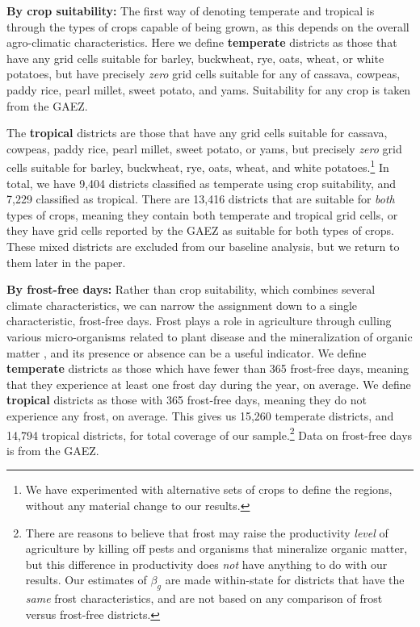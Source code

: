 \documentclass[11pt]{article}
\begin{document}
\vspace{.5cm}\noindent\textbf{By crop suitability:} The first way of denoting temperate and tropical is through the types of crops capable of being grown, as this depends on the overall agro-climatic characteristics. Here we define \textbf{temperate} districts as those that have any grid cells suitable for barley, buckwheat, rye, oats, wheat, or white potatoes, but have precisely \textit{zero} grid cells suitable for any of cassava, cowpeas, paddy rice, pearl millet, sweet potato, and yams. Suitability for any crop is taken from the GAEZ.

The \textbf{tropical} districts are those that have any grid cells suitable for cassava, cowpeas, paddy rice, pearl millet, sweet potato, or yams, but precisely \textit{zero} grid cells suitable for barley, buckwheat, rye, oats, wheat, and white potatoes.\footnote{We have experimented with alternative sets of crops to define the regions, without any material change to our results.} In total, we have 9,404 districts classified as temperate using crop suitability, and 7,229 classified as tropical. There are 13,416 districts that are suitable for \textit{both} types of crops, meaning they contain both temperate and tropical grid cells, or they have grid cells reported by the GAEZ as suitable for both types of crops. These mixed districts are excluded from our baseline analysis, but we return to them later in the paper.

\vspace{.5cm}\noindent\textbf{By frost-free days:} Rather than crop suitability, which combines several climate characteristics, we can narrow the assignment down to a single characteristic, frost-free days. Frost plays a role in agriculture through culling various micro-organisms related to plant disease and the mineralization of organic matter \citep{Masters:2001kl}, and its presence or absence can be a useful indicator. We define \textbf{temperate} districts as those which have fewer than 365 frost-free days, meaning that they experience at least one frost day during the year, on average. We define \textbf{tropical} districts as those with 365 frost-free days, meaning they do not experience any frost, on average. This gives us 15,260 temperate districts, and 14,794 tropical districts, for total coverage of our sample.\footnote{There are reasons to believe that frost may raise the productivity \textit{level} of agriculture by killing off pests and organisms that mineralize organic matter, but this difference in productivity does \textit{not} have anything to do with our results. Our estimates of $\beta_g$ are made within-state for districts that have the \textit{same} frost characteristics, and are not based on any comparison of frost versus frost-free districts.} Data on frost-free days is from the GAEZ.
\end{document}
